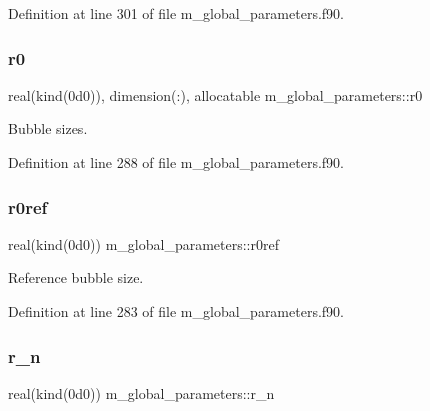 Definition at line 301 of file m\+\_\+global\+\_\+parameters.\+f90.

\mbox{\label{namespacem__global__parameters_a585a72037bbffe12e8d4512a57f52418}} 
\subsubsection{\texorpdfstring{r0}{r0}}
{\footnotesize\ttfamily real(kind(0d0)), dimension(\+:), allocatable m\+\_\+global\+\_\+parameters\+::r0}



Bubble sizes. 



Definition at line 288 of file m\+\_\+global\+\_\+parameters.\+f90.

\mbox{\label{namespacem__global__parameters_a24492f9b474683476a342e7ee42c1c6d}} 
\subsubsection{\texorpdfstring{r0ref}{r0ref}}
{\footnotesize\ttfamily real(kind(0d0)) m\+\_\+global\+\_\+parameters\+::r0ref}



Reference bubble size. 



Definition at line 283 of file m\+\_\+global\+\_\+parameters.\+f90.

\mbox{\label{namespacem__global__parameters_ae818e88601b1dc579a87e7c0c8cd87cb}} 
\subsubsection{\texorpdfstring{r\+\_\+n}{r\_n}}
{\footnotesize\ttfamily real(kind(0d0)) m\+\_\+global\+\_\+parameters\+::r\+\_\+n}



